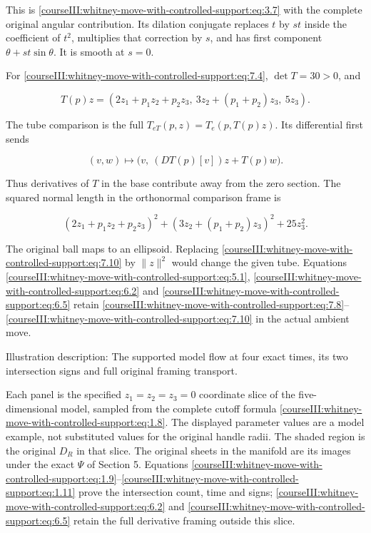This is \eqref{courseIII:whitney-move-with-controlled-support:eq:3.7} with the complete original angular contribution. Its dilation conjugate replaces \(t\) by \(st\) inside the coefficient of \(t^2\), multiplies that correction by \(s\), and has first component \(\theta+st\sin\theta\). It is smooth at \(s=0\).

For \eqref{courseIII:whitney-move-with-controlled-support:eq:7.4}, \(\det T=30>0\), and

\begin{equation}
T(p)z=(2z_1+p_1z_2+p_2z_3,\
3z_2+(p_1+p_2)z_3,\ 5z_3).
\label{courseIII:whitney-move-with-controlled-support:eq:7.8}
\end{equation}

The tube comparison is the full \(T_{eT}(p,z)=T_e(p,T(p)z)\). Its differential first sends

\begin{equation}
(v,w)\longmapsto
\bigl(v,\ (DT(p)[v])z+T(p)w\bigr).
\label{courseIII:whitney-move-with-controlled-support:eq:7.9}
\end{equation}

Thus derivatives of \(T\) in the base contribute away from the zero section. The squared normal length in the orthonormal comparison frame is

\begin{equation}
(2z_1+p_1z_2+p_2z_3)^2+
(3z_2+(p_1+p_2)z_3)^2+25z_3^2.
\label{courseIII:whitney-move-with-controlled-support:eq:7.10}
\end{equation}

The original ball maps to an ellipsoid. Replacing \eqref{courseIII:whitney-move-with-controlled-support:eq:7.10} by \(\|z\|^2\) would change the given tube. Equations \eqref{courseIII:whitney-move-with-controlled-support:eq:5.1}, \eqref{courseIII:whitney-move-with-controlled-support:eq:6.2} and \eqref{courseIII:whitney-move-with-controlled-support:eq:6.5} retain \eqref{courseIII:whitney-move-with-controlled-support:eq:7.8}--\eqref{courseIII:whitney-move-with-controlled-support:eq:7.10} in the actual ambient move.

\label{courseIII:whitney-move-with-controlled-support:supported-move-diagram}
Illustration description: The supported model flow at four exact times, its two intersection signs and full original framing transport.

Each panel is the specified \(z_1=z_2=z_3=0\) coordinate slice of the five-dimensional model, sampled from the complete cutoff formula \eqref{courseIII:whitney-move-with-controlled-support:eq:1.8}. The displayed parameter values are a model example, not substituted values for the original handle radii. The shaded region is the original \(D_R\) in that slice. The original sheets in the manifold are its images under the exact \(\Psi\) of Section 5. Equations \eqref{courseIII:whitney-move-with-controlled-support:eq:1.9}--\eqref{courseIII:whitney-move-with-controlled-support:eq:1.11} prove the intersection count, time and signs; \eqref{courseIII:whitney-move-with-controlled-support:eq:6.2} and \eqref{courseIII:whitney-move-with-controlled-support:eq:6.5} retain the full derivative framing outside this slice.

